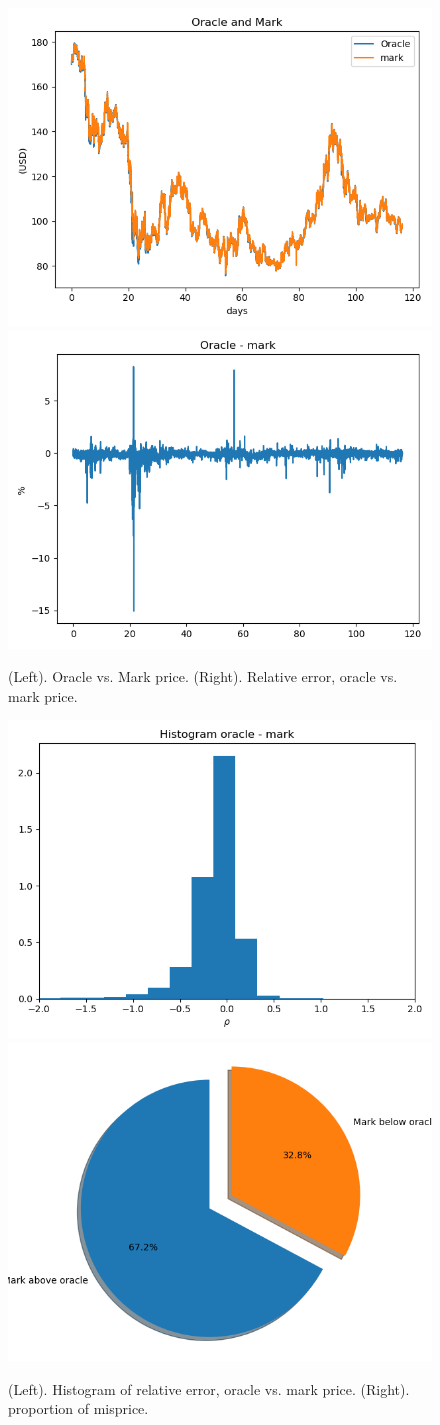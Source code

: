 \documentclass[]{scrartcl}
\begin{document}
	\begin{figure}
		\centering
		\includegraphics[width=0.47\linewidth]{figures/oracle_vs_mark}
		\includegraphics[width=0.47\linewidth]{figures/oracle_minus_mark}
		\caption{(Left). Oracle vs. Mark price.  (Right). Relative error, oracle vs. mark price.}
		\label{fig:oraclevsmark}
	\end{figure}
	
	
	
	\begin{figure}
		\centering
		\includegraphics[width=0.47\linewidth]{figures/oracle_minus_mark_hist}
		\includegraphics[width=0.47\linewidth]{figures/pie_mark_oracle}
		\caption{(Left). Histogram of relative error, oracle vs. mark price. (Right). proportion of misprice.}
		\label{fig:oraclevsmark3}
	\end{figure}
	
\end{document}
